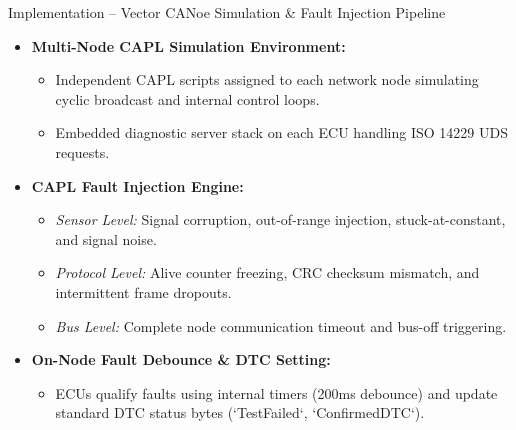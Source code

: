 \documentclass[aspectratio=169, 10pt]{beamer}
\begin{document}
\begin{frame}{Implementation -- Vector CANoe Simulation \& Fault Injection Pipeline}
  \begin{itemize}
    \item \textbf{Multi-Node CAPL Simulation Environment:}
    \begin{itemize}
      \item Independent CAPL scripts assigned to each network node simulating cyclic broadcast and internal control loops.
      \item Embedded diagnostic server stack on each ECU handling ISO 14229 UDS requests.
    \end{itemize}
    \item \textbf{CAPL Fault Injection Engine:}
    \begin{itemize}
      \item \textit{Sensor Level:} Signal corruption, out-of-range injection, stuck-at-constant, and signal noise.
      \item \textit{Protocol Level:} Alive counter freezing, CRC checksum mismatch, and intermittent frame dropouts.
      \item \textit{Bus Level:} Complete node communication timeout and bus-off triggering.
    \end{itemize}
    \item \textbf{On-Node Fault Debounce \& DTC Setting:}
    \begin{itemize}
      \item ECUs qualify faults using internal timers (200ms debounce) and update standard DTC status bytes (`TestFailed`, `ConfirmedDTC`).
    \end{itemize}
  \end{itemize}
\end{frame}
\end{document}
